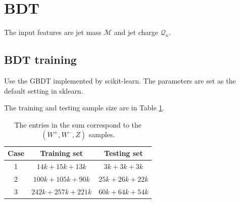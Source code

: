 \documentclass[12pt]{article}
\begin{document}

\section{BDT}%
\label{sec:bdt}
	The input features are jet mass $\mathcal{M}$ and jet charge $\mathcal{Q}_\kappa$.

	\subsection{BDT training}%
	\label{sub:bdt_training}
		Use the GBDT implemented by scikit-learn. The parameters are set as the default setting in sklearn.

		The training and testing sample size are in Table \ref{tab:BDT_sample_size}.
		\begin{table}[htpb]
			\centering
			\caption{The entries in the sum correspond to the $(W^{+}, W^{-}, Z)$ samples.}
			\label{tab:BDT_sample_size}
			\begin{tabular}{c|c|c}
			Case & Training set    & Testing set   \\ \hline
			1    & $14k+15k+13k$   & $3k+3k+3k$    \\
			2    & $100k+105k+90k$ & $25k+26k+22k$ \\
			3    & $242k+257k+221k$& $60k+64k+54k$ \\
			\end{tabular}
		\end{table}
\end{document}
